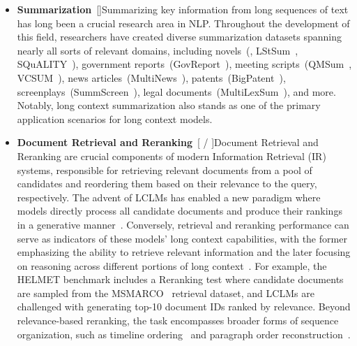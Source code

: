 \documentclass[11pt, a4paper, logo, copyright, nonumbering]{map}
\begin{document}
\begin{itemize}
    \item \textbf{Summarization}~[]\quad Summarizing key information from long sequences of text has long been a crucial research area in NLP. Throughout the development of this field, researchers have created diverse summarization datasets spanning nearly all sorts of relevant domains, including novels~(\citep{zhang2024bench}, LStSum~\citep{qiu2024clongeval}, SQuALITY~\citep{wang2022squality}), government reports~(GovReport~\citep{huang2021efficient}), meeting scripts~(QMSum~\citep{zhong2021qmsum}, VCSUM~\citep{wu2023vcsum}), news articles~(MultiNews~\citep{fabbri2019multi}), patents~(BigPatent~\citep{sharma2019bigpatent}), screenplays~(SummScreen~\citep{chen2022summscreen}), legal documents~(MultiLexSum~\citep{shen2022multi}), and more. Notably, long context summarization also stands as one of the primary application scenarios for long context models.
    \item \textbf{Document Retrieval and Reranking}~[ / ]\quad Document Retrieval and Reranking are crucial components of modern Information Retrieval (IR) systems, responsible for retrieving relevant documents from a pool of candidates and reordering them based on their relevance to the query, respectively. The advent of LCLMs has enabled a new paradigm where models directly process all candidate documents and produce their rankings in a generative manner~\citep{DBLP:conf/emnlp/0001YMWRCYR23,ma2024fine,wang2024large}. Conversely, retrieval and reranking performance can serve as indicators of these models' long context capabilities, with the former emphasizing the ability to retrieve relevant information and the later focusing on reasoning across different portions of long context~\citep{lee2024can,yen2024helmet}. For example, the HELMET benchmark includes a Reranking test where candidate documents are sampled from the MSMARCO~\citep{nguyen2016ms} retrieval dataset, and LCLMs are challenged with generating top-10 document IDs ranked by relevance. Beyond relevance-based reranking, the task encompasses broader forms of sequence organization, such as timeline ordering~\citep{wang2024leave,li2023loogle,zhang2023marathon} and paragraph order reconstruction~\citep{dong2023bamboo}.

\end{itemize}
\end{document}
